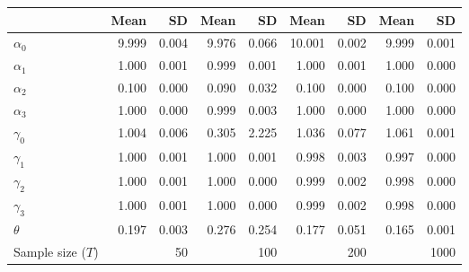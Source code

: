
\begin{tabular}[t]{lrrrrrrrr}
\toprule
  & Mean & SD & Mean  & SD  & Mean   & SD   & Mean    & SD   \\
\midrule
$\alpha_{0}$ & 9.999 & 0.004 & 9.976 & 0.066 & 10.001 & 0.002 & 9.999 & 0.001\\
$\alpha_{1}$ & 1.000 & 0.001 & 0.999 & 0.001 & 1.000 & 0.001 & 1.000 & 0.000\\
$\alpha_{2}$ & 0.100 & 0.000 & 0.090 & 0.032 & 0.100 & 0.000 & 0.100 & 0.000\\
$\alpha_{3}$ & 1.000 & 0.000 & 0.999 & 0.003 & 1.000 & 0.000 & 1.000 & 0.000\\
$\gamma_{0}$ & 1.004 & 0.006 & 0.305 & 2.225 & 1.036 & 0.077 & 1.061 & 0.001\\
$\gamma_{1}$ & 1.000 & 0.001 & 1.000 & 0.001 & 0.998 & 0.003 & 0.997 & 0.000\\
$\gamma_{2}$ & 1.000 & 0.001 & 1.000 & 0.000 & 0.999 & 0.002 & 0.998 & 0.000\\
$\gamma_{3}$ & 1.000 & 0.001 & 1.000 & 0.000 & 0.999 & 0.002 & 0.998 & 0.000\\
$\theta$ & 0.197 & 0.003 & 0.276 & 0.254 & 0.177 & 0.051 & 0.165 & 0.001\\
Sample size ($T$) &  & 50 &  & 100 &  & 200 &  & 1000\\
\bottomrule
\end{tabular}
